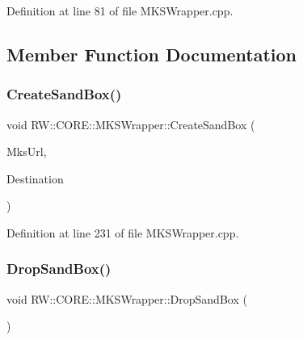 Definition at line 81 of file M\+K\+S\+Wrapper.\+cpp.



\subsection{Member Function Documentation}
\hypertarget{class_r_w_1_1_c_o_r_e_1_1_m_k_s_wrapper_a75d87604a9244ce6e3a41934dd60b28f}{}\label{class_r_w_1_1_c_o_r_e_1_1_m_k_s_wrapper_a75d87604a9244ce6e3a41934dd60b28f} 
\subsubsection{\texorpdfstring{Create\+Sand\+Box()}{CreateSandBox()}}
{\footnotesize\ttfamily void R\+W\+::\+C\+O\+R\+E\+::\+M\+K\+S\+Wrapper\+::\+Create\+Sand\+Box (\begin{DoxyParamCaption}\item[{Q\+String}]{Mks\+Url,  }\item[{Q\+String}]{Destination }\end{DoxyParamCaption})\hspace{0.3cm}{\ttfamily [private]}}



Definition at line 231 of file M\+K\+S\+Wrapper.\+cpp.

\hypertarget{class_r_w_1_1_c_o_r_e_1_1_m_k_s_wrapper_a1f4bcd6096a326fc1329f1d63e207ec3}{}\label{class_r_w_1_1_c_o_r_e_1_1_m_k_s_wrapper_a1f4bcd6096a326fc1329f1d63e207ec3} 
\subsubsection{\texorpdfstring{Drop\+Sand\+Box()}{DropSandBox()}}
{\footnotesize\ttfamily void R\+W\+::\+C\+O\+R\+E\+::\+M\+K\+S\+Wrapper\+::\+Drop\+Sand\+Box (\begin{DoxyParamCaption}{ }\end{DoxyParamCaption})\hspace{0.3cm}{\ttfamily [private]}}



